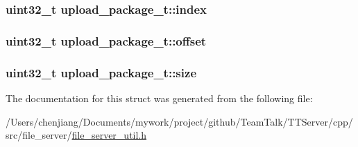 \subsubsection[{index}]{\setlength{\rightskip}{0pt plus 5cm}uint32\+\_\+t upload\+\_\+package\+\_\+t\+::index}\label{structupload__package__t_a2a238584592e184ae312d951d25ed8ba}
\hypertarget{structupload__package__t_ab4a75c13d807d9b3d2b917f7e0ead2ec}{}
\subsubsection[{offset}]{\setlength{\rightskip}{0pt plus 5cm}uint32\+\_\+t upload\+\_\+package\+\_\+t\+::offset}\label{structupload__package__t_ab4a75c13d807d9b3d2b917f7e0ead2ec}
\hypertarget{structupload__package__t_acc8ac6adcca8cfd35a48184ffd6b4a9c}{}
\subsubsection[{size}]{\setlength{\rightskip}{0pt plus 5cm}uint32\+\_\+t upload\+\_\+package\+\_\+t\+::size}\label{structupload__package__t_acc8ac6adcca8cfd35a48184ffd6b4a9c}


The documentation for this struct was generated from the following file\+:\begin{DoxyCompactItemize}
\item 
/\+Users/chenjiang/\+Documents/mywork/project/github/\+Team\+Talk/\+T\+T\+Server/cpp/src/file\+\_\+server/\hyperlink{file__server__util_8h}{file\+\_\+server\+\_\+util.\+h}\end{DoxyCompactItemize}
